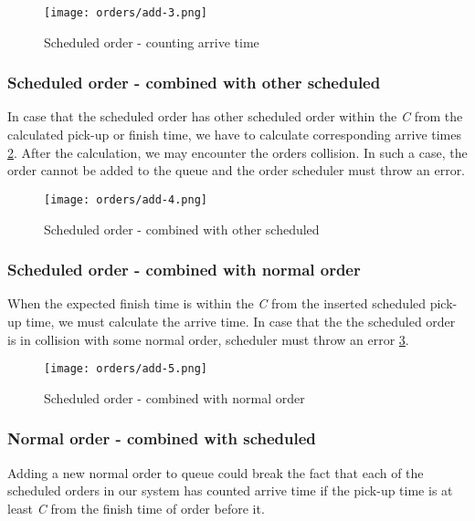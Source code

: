 		\begin{figure}[h]\centering
			\texttt{[image: orders/add-3.png]}
			\caption{Scheduled order - counting arrive time} 
			\label{order-process-scheduled-order-counting-arrive-time}
		\end{figure} 
	
	
	\subsubsection{Scheduled order - combined with other scheduled}
			In case that the scheduled order has other scheduled order within the \textit{C} from the calculated pick-up or finish time, we have to calculate corresponding arrive times \ref{order-process-scheduled-order-combined-with-scheduled}. 
			After the calculation, we may encounter the orders collision. In such a case, the order cannot be added to the queue and the order scheduler must throw an error. 
			
			\begin{figure}[h]\centering
				\texttt{[image: orders/add-4.png]}
				\caption{Scheduled order - combined with other scheduled} 
				\label{order-process-scheduled-order-combined-with-scheduled}
			\end{figure} 
		
	\subsubsection{Scheduled order - combined with normal order}
		When the expected finish time is within the \textit{C} from the inserted scheduled pick-up time, we must calculate the arrive time. In case that the the scheduled order is in collision with some normal order, scheduler must throw an error \ref{order-process-scheduled-order-combined-with-normal}.
		 
		\begin{figure}[h]\centering
			\texttt{[image: orders/add-5.png]}
			\caption{Scheduled order - combined with normal order} 
			\label{order-process-scheduled-order-combined-with-normal}
		\end{figure} 
	
			
	\subsubsection{Normal order - combined with scheduled}
	Adding a new normal order to queue could break the fact that each of the scheduled orders in our system has counted arrive time if the pick-up time is at least \textit{C} from the finish time of order before it.
	
